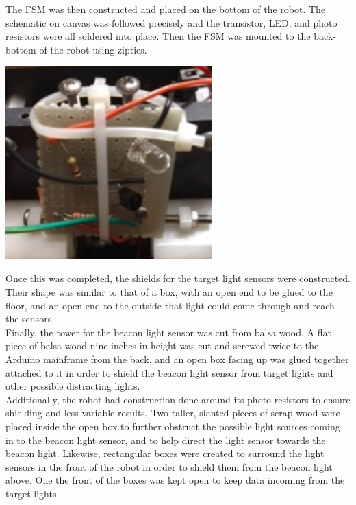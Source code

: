 \documentclass{article}
\begin{document}
	The FSM was then constructed and placed on the bottom of the robot. The schematic on canvas was followed precisely and the transistor, LED, and photo resistors were all soldered into place. Then the FSM was mounted to the back-bottom of the robot using zipties. \\
	
	\begin{center}
	\includegraphics[width=8cm]{FSM.png}
	\end{center}
	
	Once this was completed, the shields for the target light sensors were constructed. Their shape was similar to that of a box, with an open end to be glued to the floor, and an open end to the outside that light could come through and reach the sensors. \\
	
	Finally, the tower for the beacon light sensor was cut from balsa wood. A flat piece of balsa wood nine inches in height was cut and screwed twice to the Arduino mainframe from the back, and an open box facing up was glued together attached to it in order to shield the beacon light sensor from target lights and other possible distracting lights. \\
	
	Additionally, the robot had construction done around its photo resistors to ensure shielding and less variable results. Two taller, slanted pieces of scrap wood were placed inside the open box to further obstruct the possible light sources coming in to the beacon light sensor, and to help direct the light sensor towards the beacon light. Likewise, rectangular boxes were created to surround the light sensors in the front of the robot in order to shield them from the beacon light above. One the front of the boxes was kept open to keep data incoming from the target lights.\\
	
\end{document}
